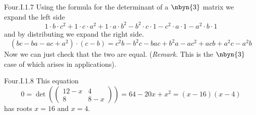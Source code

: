 \begin{ans}{Four.I.1.7}
       Using the formula for the determinant of a $\nbyn{3}$ matrix
       we expand the left side
       \begin{equation*}
         1\cdot b\cdot c^2+1\cdot c\cdot a^2+1\cdot a\cdot b^2
          -b^2\cdot c\cdot 1 -c^2\cdot a\cdot 1-a^2\cdot b\cdot 1
       \end{equation*}
       and by distributing we expand the right side.
       \begin{equation*}
         (bc-ba-ac+a^2)\cdot(c-b)
         =c^2b-b^2c-bac+b^2a-ac^2+acb+a^2c-a^2b
       \end{equation*}
       Now we can just check that the two are equal.
       (\textit{Remark}.
       This is the \( \nbyn{3} \) case of
        which arises in applications).
     
\end{ans}
\begin{ans}{Four.I.1.8}
         This equation
         \begin{equation*}
           0=
           \det(
             \begin{pmatrix}
                12-x  &4  \\
                8    &8-x
             \end{pmatrix}
           )
           =64-20x+x^2
           =(x-16)(x-4)
       \end{equation*}
       has roots \( x=16 \) and \( x=4 \).
     
\end{ans}
